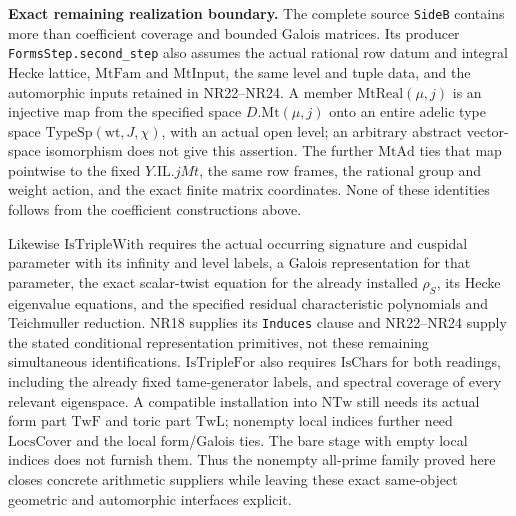 \medskip
\noindent\textbf{Exact remaining realization boundary.}
The complete source \texttt{SideB} contains more than coefficient
coverage and bounded Galois matrices. Its producer
\texttt{FormsStep.second\_step} also assumes the actual rational
row datum and integral Hecke lattice, $\mathrm{MtFam}$ and
$\mathrm{MtInput}$, the same level and tuple data, and the
automorphic inputs retained in NR22--NR24. A member
$\mathrm{MtReal}(\mu,j)$ is an injective map from the specified
space $D.\mathrm{Mt}(\mu,j)$ onto an entire adelic type space
$\mathrm{TypeSp}(\mathrm{wt},J,\chi)$, with an actual open level;
an arbitrary abstract vector-space isomorphism does not give
this assertion. The further $\mathrm{MtAd}$ ties that map
pointwise to the fixed $Y.\mathrm{IL}.jMt$, the same row frames,
the rational group and weight action, and the exact finite
matrix coordinates. None of these identities follows from
the coefficient constructions above.

Likewise $\mathrm{IsTripleWith}$ requires the actual occurring
signature and cuspidal parameter with its infinity and level
labels, a Galois representation for that parameter, the exact
scalar-twist equation for the already installed $\rho_S$, its
Hecke eigenvalue equations, and the specified residual
characteristic polynomials and Teichmuller reduction. NR18
supplies its \texttt{Induces} clause and NR22--NR24 supply the
stated conditional representation primitives, not these
remaining simultaneous identifications. $\mathrm{IsTripleFor}$
also requires $\mathrm{IsChars}$ for both readings, including
the already fixed tame-generator labels, and spectral coverage
of every relevant eigenspace. A compatible installation into
$\mathrm{NTw}$ still needs its actual form part $\mathrm{TwF}$
and toric part $\mathrm{TwL}$; nonempty local indices further
need $\mathrm{LocsCover}$ and the local form/Galois ties. The
bare stage with empty local indices does not furnish them.
Thus the nonempty all-prime family proved here closes concrete
arithmetic suppliers while leaving these exact same-object
geometric and automorphic interfaces explicit.

